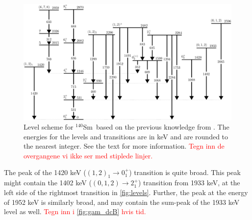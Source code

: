\documentclass[twoside,english]{uiofysmaster/uiofysmaster}
\newcommand{\Sm}{$^{140}$Sm} %
\let\orgautoref\autoref
\renewcommand{\autoref}
        {%
		 \def\sectionautorefname{Section}%
		 \def\subsectionautorefname{Section}%
		 \def\subsubsectionautorefname{Section}%
		 \def\chapterautorefname{Chapter}%
          \orgautoref}
\begin{document}
\begin{figure}[ht!]
	\centering
	\includegraphics[width=\textwidth]{Images/Level-scheme-140Sm-v2.png}
	\caption{Level scheme for \Sm\ based on the previous knowledge from \cite{Klintefjord, NNDC-levels}. 
	The energies for the levels and transitions are in keV and are rounded to the nearest integer.
	See the text for more information. 
	\textcolor{red}{Tegn inn de overgangene vi ikke ser med stiplede linjer.}
	}
	\label{fig:levels}
\end{figure}


The peak of the 1420 keV ($(1,2)_1 \rightarrow 0_1^+$) transition is quite broad. 
This peak might contain the 1402 keV ($(0,1,2) \rightarrow 2_1^+$) transition from 1933 keV, at the left side of the rightmost transition in \autoref{fig:levels}.
Further, the peak at the energy of 1952 keV is similarly broad, and may contain the sum-peak of the 1933 keV level as well. 
\textcolor{red}{Tegn inn i \autoref{fig:gam_dcB} hvis tid.}
\end{document}
